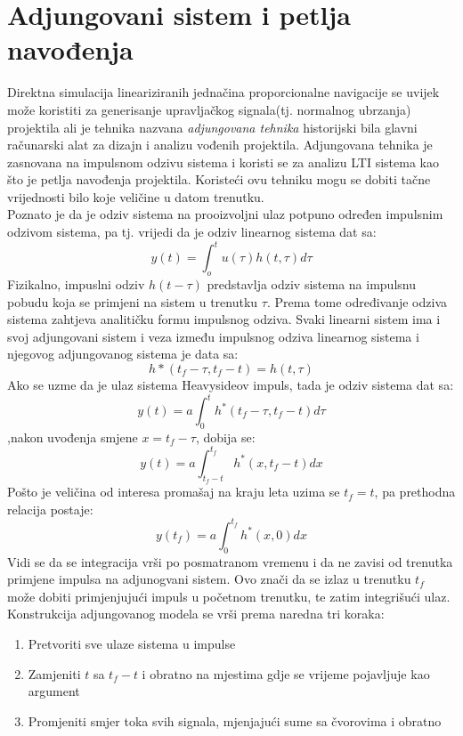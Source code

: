 \section{Adjungovani sistem i petlja navođenja}
Direktna simulacija lineariziranih jednačina proporcionalne navigacije se uvijek može
koristiti za generisanje upravljačkog signala(tj. normalnog ubrzanja) projektila
ali je tehnika nazvana \textit{adjungovana tehnika} historijski bila glavni računarski 
alat za dizajn i analizu vođenih projektila. Adjungovana tehnika je zasnovana 
na impulsnom odzivu sistema i koristi se  za analizu LTI sistema kao što je 
petlja navođenja projektila. Koristeći ovu tehniku mogu se dobiti tačne vrijednosti 
bilo koje veličine u datom trenutku.\\
Poznato je da je odziv sistema na prooizvoljni ulaz potpuno određen impulsnim odzivom sistema, pa 
tj. vrijedi da je odziv linearnog sistema dat sa:
\begin{equation}
    y(t)=\int_o^tu(\tau)h(t,\tau)d\tau
\end{equation}
Fizikalno, impuslni odziv $h(t-\tau)$ predstavlja odziv sistema na impulsnu pobudu koja 
se primjeni na sistem u trenutku $\tau$. Prema tome određivanje odziva sistema zahtjeva analitičku 
formu impulsnog odziva. Svaki linearni sistem ima i svoj adjungovani sistem i veza između impulsnog 
odziva linearnog sistema i njegovog adjungovanog sistema je data sa:
\begin{equation}
    h*(t_f-\tau,t_f-t)=h(t,\tau)
\end{equation}
Ako se uzme da je ulaz sistema Heavysideov impuls, tada je odziv sistema dat sa:
\begin{equation}
    y(t)=a\int_0^t h^*(t_f-\tau,t_f-t)d\tau
\end{equation}
,nakon uvođenja smjene $x=t_f-\tau$, dobija se:
\begin{equation}
    y(t)=a\int_{t_f-t}^{t_f}h^*(x,t_f-t)dx
\end{equation}
Pošto je veličina od interesa promašaj na kraju leta uzima se $t_f=t$, pa prethodna relacija
postaje:
\begin{equation}
    y(t_f)=a\int_{0}^{t_f}h^*(x,0)dx
\end{equation}
Vidi se da se integracija vrši po posmatranom vremenu i da ne zavisi od trenutka primjene impulsa na adjunogvani sistem. 
Ovo znači da se izlaz u trenutku $t_f$ može dobiti primjenjujući impuls u početnom trenutku, te zatim integrišući ulaz. 
Konstrukcija adjungovanog modela se vrši prema naredna tri koraka:
\begin{enumerate}
    \item Pretvoriti sve ulaze sistema u impulse
    \item Zamjeniti $t$ sa $t_f-t$ i obratno na mjestima gdje se vrijeme pojavljuje kao argument
    \item Promjeniti smjer toka svih signala, mjenjajući sume sa čvorovima i obratno
\end{enumerate}

